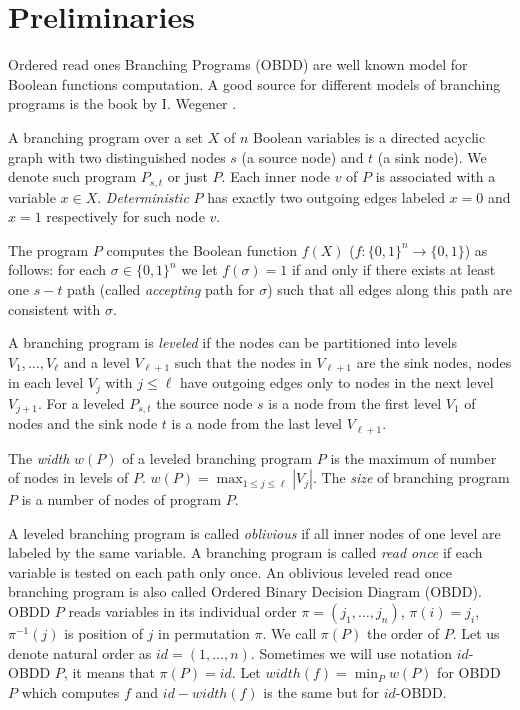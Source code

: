 \documentclass{llncs}
\begin{document}
\section{Preliminaries}\label{sec:prlmrs}

Ordered  read ones  Branching Programs (OBDD) are well known model for Boolean functions computation. A good source for different models of branching programs is the book by I. Wegener  \cite{Weg00}.

A branching program  over a set $X$ of $n$ Boolean variables is
a directed acyclic graph with two distinguished nodes $s$ (a source node) and $t$ (a sink node). We denote  such program $P_{s,t}$ or just $P$.   Each inner node $v$  of $P$ is associated with a variable $x\in X$. {\em Deterministic} $P$ has exactly two outgoing edges labeled $x=0$   and $x=1$ respectively for such node $v$.

The program $P$ computes the Boolean function $f(X)$ ($f:\{0,1\}^n \rightarrow \{0,1\}$) as follows: for each $\sigma\in\{0,1\}^n$ we let $f(\sigma)=1$ if and only if there exists at least one $s-t$ path (called {\em accepting} path for $\sigma$) such that all edges along this path are consistent with $\sigma$.


A branching program is {\em leveled} if the nodes can be partitioned into levels $V_1, \ldots, V_\ell$ and a level $V_{\ell+1}$ such that the nodes in $V_{\ell+1}$ are the sink nodes, nodes in each level $V_j$ with $j \le \ell$ have outgoing edges only to nodes in the next level $V_{j+1}$. For a leveled $P_{s,t}$ the source node $s$ is a node from the first level  $V_1$ of nodes  and the sink node $t$ is a node from the last level $V_{\ell+1}$.

The {\em width} $w(P)$ of a leveled branching program $P$ is the maximum
of number of nodes in  levels of $P$. $ w(P)=\max_{1\le j\le \ell}|V_j|. $ The {\em size} of branching program $P$ is a number of  nodes of
program $P$.

A leveled branching program is called {\em oblivious} if all inner
nodes of one level are labeled by the same variable.  A branching
program is called {\em read once} if each variable is tested on each
path only once. 
An oblivious leveled read once branching program is also called Ordered  Binary Decision Diagram (OBDD).
OBDD $P$ reads variables in its individual  order
$\pi=(j_1,\dots,j_n)$, $\pi(i)=j_i$, $\pi^{-1}(j)$ is position of $j$ in permutation $\pi$. We call $\pi(P)$ the order of $P$. Let us denote natural order as $id=(1,\dots,n)$. Sometimes we will use notation $id$-OBDD $P$, it means that $\pi(P)=id$. Let $width(f)=\min_{P}w(P)$ for OBDD $P$ which computes $f$ and $id\!-\!width(f)$ is the same but for $id$-OBDD.
\end{document}
